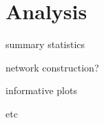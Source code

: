 

\section{Analysis} \label{sec:analysis}

summary statistics

network construction?

informative plots

etc
